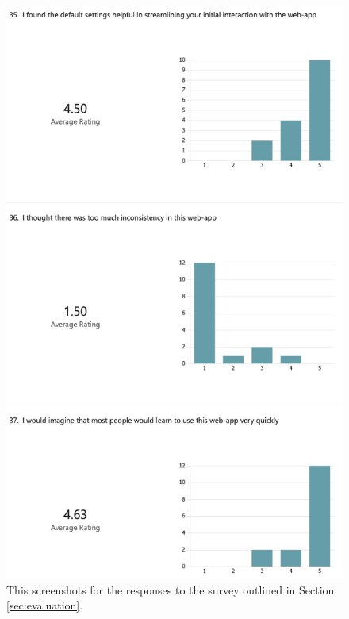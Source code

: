\documentclass{l4proj}
\begin{document}
\begin{appendices}
\begin{figure}[H]
    \centering
    \includegraphics[width=0.75\linewidth]{dissertation/images/eval-10.jpeg}    
    \caption{This screenshots for the responses to the survey outlined in Section \ref{sec:evaluation}.}
    \label{fig:eval-survey-10} 
\end{figure}


\end{appendices}
\end{document}
